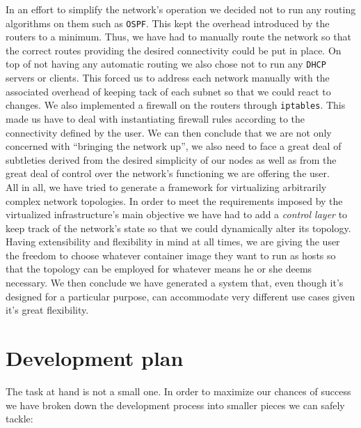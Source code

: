\documentclass[12pt]{article}
\begin{document}
        In an effort to simplify the network's operation we decided not to run any routing algorithms on them such as \texttt{OSPF}. This kept the overhead introduced by the routers to a minimum. Thus, we have had to manually route the network so that the correct routes providing the desired connectivity could be put in place. On top of not having any automatic routing we also chose not to run any \texttt{DHCP} servers or clients. This forced us to address each network manually with the associated overhead of keeping tack of each subnet so that we could react to changes. We also implemented a firewall on the routers through \texttt{iptables}. This made us have to deal with instantiating firewall rules according to the connectivity defined by the user. We can then conclude that we are not only concerned with ``bringing the network up'', we also need to face a great deal of subtleties derived from the desired simplicity of our nodes as well as from the great deal of control over the network's functioning we are offering the user.\\

        All in all, we have tried to generate a framework for virtualizing arbitrarily complex network topologies. In order to meet the requirements imposed by the virtualized infrastructure's main objective we have had to add a \textit{control layer} to keep track of the network's state so that we could dynamically alter its topology. Having extensibility and flexibility in mind at all times, we are giving the user the freedom to choose whatever container image they want to run as hosts so that the topology can be employed for whatever means he or she deems necessary. We then conclude we have generated a system that, even though it's designed for a particular purpose, can accommodate very different use cases given it's great flexibility.\\

    \section{Development plan}
        The task at hand is not a small one. In order to maximize our chances of success we have broken down the development process into smaller pieces we can safely tackle:
\end{document}
